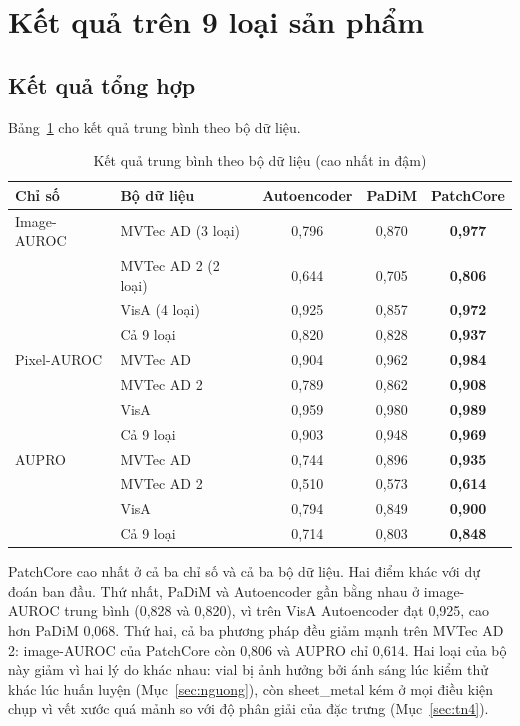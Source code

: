 \section{Kết quả trên 9 loại sản phẩm}
\label{sec:ket-qua-tong-hop}

\subsection{Kết quả tổng hợp}

Bảng~\ref{tab:summary} cho kết quả trung bình theo bộ dữ liệu.

\begin{table}[htbp]
  \centering
  \caption{Kết quả trung bình theo bộ dữ liệu (cao nhất in đậm)}
  \label{tab:summary}
  \begin{tabular}{@{}llccc@{}}
    \toprule
    Chỉ số & Bộ dữ liệu & Autoencoder & PaDiM & PatchCore \\
    \midrule
    Image-AUROC & MVTec AD (3 loại)   & 0,796 & 0,870 & \textbf{0,977} \\
                & MVTec AD 2 (2 loại) & 0,644 & 0,705 & \textbf{0,806} \\
                & VisA (4 loại)       & 0,925 & 0,857 & \textbf{0,972} \\
                & Cả 9 loại           & 0,820 & 0,828 & \textbf{0,937} \\
    \midrule
    Pixel-AUROC & MVTec AD            & 0,904 & 0,962 & \textbf{0,984} \\
                & MVTec AD 2          & 0,789 & 0,862 & \textbf{0,908} \\
                & VisA                & 0,959 & 0,980 & \textbf{0,989} \\
                & Cả 9 loại           & 0,903 & 0,948 & \textbf{0,969} \\
    \midrule
    AUPRO       & MVTec AD            & 0,744 & 0,896 & \textbf{0,935} \\
                & MVTec AD 2          & 0,510 & 0,573 & \textbf{0,614} \\
                & VisA                & 0,794 & 0,849 & \textbf{0,900} \\
                & Cả 9 loại           & 0,714 & 0,803 & \textbf{0,848} \\
    \bottomrule
  \end{tabular}
\end{table}

PatchCore cao nhất ở cả ba chỉ số và cả ba bộ dữ liệu. Hai điểm khác với dự đoán ban đầu. Thứ nhất, PaDiM và
Autoencoder gần bằng nhau ở image-AUROC trung bình (0,828 và 0,820), vì trên VisA Autoencoder đạt 0,925, cao hơn
PaDiM 0,068. Thứ hai, cả ba phương pháp đều giảm mạnh trên MVTec AD 2: image-AUROC của PatchCore còn 0,806 và AUPRO
chỉ 0,614. Hai loại của bộ này giảm vì hai lý do khác nhau: vial bị ảnh hưởng bởi ánh sáng lúc kiểm thử khác lúc
huấn luyện (Mục~\ref{sec:nguong}), còn sheet\_metal kém ở mọi điều kiện chụp vì vết xước quá mảnh so với độ phân giải
của đặc trưng (Mục~\ref{sec:tn4}).

